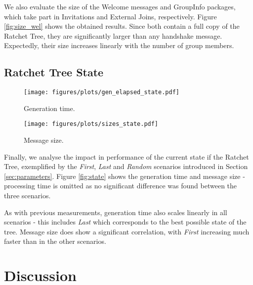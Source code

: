 \documentclass[preprint, 12pt]{elsarticle}
\begin{document}
We also evaluate the size of the Welcome messages and GroupInfo packages, which take part in Invitations and External Joins, respectively. Figure \ref{fig:size_wel} shows the obtained results. Since both contain a full copy of the Ratchet Tree, they are significantly larger than any handshake message. Expectedly, their size increases linearly with the number of group members.

\subsection{Ratchet Tree State}

\begin{figure*}[t]
    \centering
    \begin{subfigure}[b]{0.45\textwidth}
        \centering
        \texttt{[image: figures/plots/gen\_elapsed\_state.pdf]}
        \caption{Generation time.}
        \label{fig:state_gen}
    \end{subfigure}
    \begin{subfigure}[b]{0.45\textwidth}
        \centering
        \texttt{[image: figures/plots/sizes\_state.pdf]}
        \caption{Message size.}
        \label{fig:state_size}
    \end{subfigure}
    \caption{Generation time and message size for different states of the group's Ratchet Tree. Processing time is omitted as it is not influenced by this metric.}
    \label{fig:state}
\end{figure*}

Finally, we analyse the impact in performance of the current state if the Ratchet Tree, exemplified by the \textit{First}, \textit{Last} and \textit{Random} scenarios introduced in Section \ref{sec:parameters}. Figure \ref{fig:state} shows the generation time and message size - processing time is omitted as no significant difference was found between the three scenarios. 

As with previous measurements, generation time also scales linearly in all scenarios - this includes \textit{Last} which corresponds to the best possible state of the tree. Message size does show a significant correlation, with \textit{First} increasing much faster than in the other scenarios.

\section{Discussion}
\label{sec:discussion}
\end{document}
